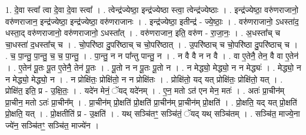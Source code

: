 \documentclass[17pt]{extarticle}
\begin{document}
1. दे॒वा स्त्वा᳚ त्वा दे॒वा दे॒वा स्त्वा᳚ । . त्वेन्द्र॑ज्येष्ठा॒ इन्द्र॑ज्येष्ठा स्त्वा॒ त्वेन्द्र॑ज्येष्ठाः । . इन्द्र॑ज्येष्ठा॒ वरु॑णराजानो॒ वरु॑णराजान॒ इन्द्र॑ज्येष्ठा॒ इन्द्र॑ज्येष्ठा॒ वरु॑णराजानः । . इन्द्र॑ज्येष्ठा॒ इतीन्द्र॑ - ज्ये॒ष्ठाः॒ । . वरु॑णराजानो॒ ऽधस्ता॑द॒ धस्ता॒द् वरु॑णराजानो॒ वरु॑णराजानो॒ ऽधस्ता᳚त् । . वरु॑णराजान॒ इति॒ वरु॑ण - रा॒जा॒नः॒ । . अ॒धस्ता᳚च् च चा॒धस्ता॑ द॒धस्ता᳚च् च । . चो॒परि॑ष्ठा दु॒परि॑ष्ठाच् च चो॒परि॑ष्ठात् । . उ॒परि॑ष्ठाच् च चो॒परि॑ष्ठा दु॒परि॑ष्ठाच् च । . च॒ पा॒न्तु॒ पा॒न्तु॒ च॒ च॒ पा॒न्तु॒ । . पा॒न्तु॒ न न पा᳚न्तु पान्तु॒ न । . न वै वै न न वै । . वा ए॒तेनै॒ तेन॒ वै वा ए॒तेन॑ । . ए॒तेन॑ पू॒तः पू॒त ए॒तेनै॒ तेन॑ पू॒तः । . पू॒तो न न पू॒तः पू॒तो न । . न मेद्ध्यो॒ मेद्ध्यो॒ न न मेद्ध्यः॑ । . मेद्ध्यो॒ न न मेद्ध्यो॒ मेद्ध्यो॒ न । . न प्रोक्षि॑तः॒ प्रोक्षि॑तो॒ न न प्रोक्षि॑तः । . प्रोक्षि॑तो॒ यद् यत् प्रोक्षि॑तः॒ प्रोक्षि॑तो॒ यत् । . प्रोक्षि॑त॒ इति॒ प्र - उ॒क्षि॒तः॒ । . यदे॑न मेनं॒ ॅयद् यदे॑नम् । . ए॒न॒ मतो ऽत॑ एन मेन॒ मतः॑ । . अतः॑ प्रा॒चीन॑म् प्रा॒चीन॒ मतो ऽतः॑ प्रा॒चीन᳚म् । . प्रा॒चीन॑म् प्रो॒क्षति॑ प्रो॒क्षति॑ प्रा॒चीन॑म् प्रा॒चीन॑म् प्रो॒क्षति॑ । . प्रो॒क्षति॒ यद् यत् प्रो॒क्षति॑ प्रो॒क्षति॒ यत् । . प्रो॒क्षतीति॑ प्र - उ॒क्षति॑ । . यथ् सञ्चि॑तꣳ॒॒ सञ्चि॑तं॒ ॅयद् यथ् सञ्चि॑तम् । . सञ्चि॑त॒ माज्ये॒ना ज्ये॑न॒ सञ्चि॑तꣳ॒॒ सञ्चि॑त॒ माज्ये॑न । \newline
\end{document}
